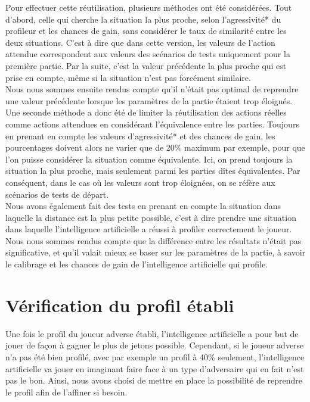 \documentclass{report}
\begin{document}
Pour effectuer cette réutilisation, plusieurs méthodes ont été considérées. Tout d'abord, celle qui cherche la situation la plus proche, selon l'agressivité* du profileur et les chances de gain, sans considérer le taux de similarité entre les deux situations. C'est à dire que dans cette version, les valeurs de l'action attendue correspondent aux valeurs des scénarios de tests uniquement pour la première partie. Par la suite, c'est la valeur précédente la plus proche qui est prise en compte, même si la situation n'est pas forcément similaire.\\

Nous nous sommes ensuite rendus compte qu'il n'était pas optimal de reprendre une valeur précédente lorsque les paramètres de la partie étaient trop éloignés. Une seconde méthode a donc été de limiter la réutilisation des actions réelles comme actions attendues en considérant l'équivalence entre les parties. Toujours en prenant en compte les valeurs d'agressivité* et des chances de gain, les pourcentages doivent alors ne varier que de 20\% maximum par exemple, pour que l'on puisse considérer la situation comme équivalente. Ici, on prend toujours la situation la plus proche, mais seulement parmi les parties dîtes équivalentes. Par conséquent, dans le cas où les valeurs sont trop éloignées, on se réfère aux scénarios de tests de départ.\\

Nous avons également fait des tests en prenant en compte la situation dans laquelle la distance est la plus petite possible, c'est à dire prendre une situation dans laquelle l'intelligence artificielle a réussi à profiler correctement le joueur. Nous nous sommes rendus compte que la différence entre les résultats n'était pas significative, et qu'il valait mieux se baser sur les paramètres de la partie, à savoir le calibrage et les chances de gain de l'intelligence artificielle qui profile.\\

\section{Vérification du profil établi}

\hspace{0.5cm}Une fois le profil du joueur adverse établi, l'intelligence artificielle a pour but de jouer de façon à gagner le plus de jetons possible. Cependant, si le joueur adverse n'a pas été bien profilé, avec par exemple un profil à 40\% seulement, l'intelligence artificielle va jouer en imaginant faire face à un type d'adversaire qui en fait n'est pas le bon. Ainsi, nous avons choisi de mettre en place la possibilité de reprendre le profil afin de l’affiner si besoin. \\
\end{document}
